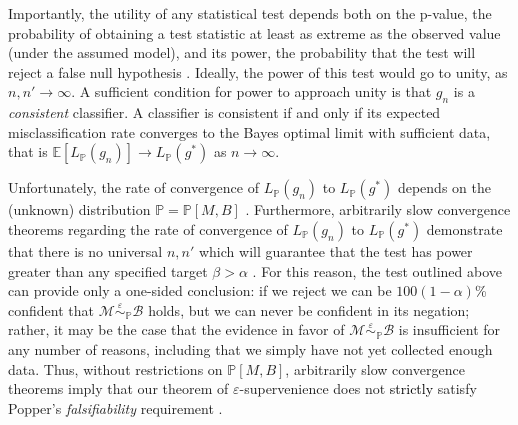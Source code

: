 \documentclass{article}
\newcommand{\conv}{\rightarrow}
\newcommand{\mB}{\mathcal{B}}
\newcommand{\mM}{\mathcal{M}}
\newcommand{\PP}{\mathbb{P}}           %
\newcommand{\EE}{\mathbb{E}}           %
\newcommand{\eps}{\varepsilon}
\providecommand{\mc}[1]{\mathcal{#1}}
\newcommand{\MeB}{\mM \overset{\varepsilon}{{\sim}}_{\PP} \mB}
\providecommand{\tr}[1]{\textcolor{black}{#1}}
\newtheorem{thm}{Theorem}
\begin{document}
Importantly, the utility of any statistical test depends both on the p-value, the probability of obtaining a test statistic at least as extreme as the observed value (under the assumed model), and its power, the probability that the test will reject a false null hypothesis%
.  Ideally, the power of this test would go to unity, as $n,n' \rightarrow \infty$.  A sufficient condition for power to approach unity is that $g_n$ is a \emph{consistent} classifier.  A classifier is consistent if and only if its expected misclassification rate converges to the Bayes optimal limit with sufficient data, that is $\EE[L_{\PP}(g_n)] \conv L_{\PP}(g^*)$ as $n\conv \infty$. %
% 


Unfortunately, the rate of convergence of $L_{\PP}(g_n)$ to $L_{\PP}(g^*)$ depends on the (unknown) distribution $\PP=\PP[M,B]$ \cite{DGL96}. Furthermore, arbitrarily slow convergence theorems regarding the rate of convergence of $L_{\PP}(g_n)$ to $L_{\PP}(g^*)$ demonstrate that there is no universal $n,n'$ which will guarantee that the test has power greater than any specified target $\beta > \alpha$ \cite{Devroye83}. For this reason, the test outlined above can provide only a one-sided conclusion: if we reject we can be $100(1-\alpha)$\% confident that $\MeB$ holds, but we can never be confident in its negation; rather, %
it may be the case that the evidence in favor of $\MeB$ is insufficient for any number of reasons, including that we simply have not yet collected enough data. %
Thus, without restrictions on $\PP[M,B]$, arbitrarily slow convergence theorems imply that our theorem of $\varepsilon$-supervenience does not \tr{strictly} satisfy Popper's {\it falsifiability} requirement \cite{Popper}. %
\end{document}

